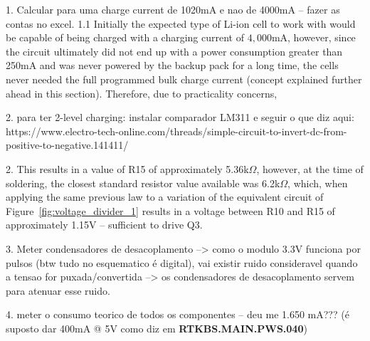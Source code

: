 
1. Calcular para uma charge current de 1020mA e nao de 4000mA -- fazer as contas no excel.
1.1 Initially the expected type of Li-ion cell to work with would be capable of being charged with a charging current of $4,000$mA, however, since the circuit ultimately did not end up with a power consumption greater than 250mA and was never powered by the backup pack for a long time, the cells never needed the full programmed bulk charge current (concept explained further ahead in this section). Therefore, due to practicality concerns,

2. para ter 2-level charging: instalar comparador LM311 e seguir o que diz aqui: https://www.electro-tech-online.com/threads/simple-circuit-to-invert-dc-from-positive-to-negative.141411/

2. This results in a value of R15 of approximately 5.36k$\Omega$, however, at the time of soldering, the closest standard resistor value available was 6.2k$\Omega$, which, when applying the same previous law to a variation of the equivalent circuit of Figure~\ref{fig:voltage_divider_1} results in a voltage between R10 and R15 of approximately 1.15V -- sufficient to drive Q3.

3. Meter condensadores de desacoplamento --> como o modulo 3.3V funciona por pulsos (btw tudo no esquematico é digital), vai existir ruido consideravel quando a tensao for puxada/convertida --> os condensadores de desacoplamento servem para atenuar esse ruido.

4. meter o consumo teorico de todos os componentes -- deu me 1.650 mA??? (é suposto dar 400mA @ 5V como diz em \textbf{RTKBS.MAIN.PWS.040})

